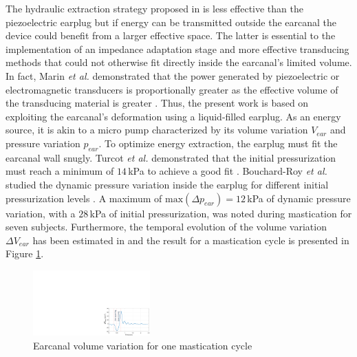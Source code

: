 \documentclass[3p,twocolumn,preprint]{elsarticle}
\begin{document}
The hydraulic extraction strategy proposed in \cite{Delnavaz2012} is less effective than the piezoelectric earplug but if energy can be transmitted outside the earcanal the device could benefit from a larger effective space. The latter is essential to the implementation of an impedance adaptation stage and more effective transducing methods that could not otherwise fit directly inside the earcanal's limited volume. In fact, Marin \emph{et al.} demonstrated that the power generated by piezoelectric or electromagnetic transducers is proportionally greater as the effective volume of the transducing material is greater \cite{Marin2011}. Thus, the present work is based on exploiting the earcanal's deformation using a liquid-filled earplug. As an energy source, it is akin to a micro pump characterized by its volume variation $V_{ear}$ and pressure variation $p_{ear}$. To optimize energy extraction, the earplug must fit the earcanal wall snugly. Turcot \emph{et al.} demonstrated that the initial pressurization must reach a minimum of $14$\,kPa to achieve a good fit \cite{TURCOT2011}. Bouchard-Roy \emph{et al.} studied the dynamic pressure variation inside the earplug for different initial pressurization levels \cite{Bouchard-Roy2020}. A maximum of $\text{max}(\Delta p_{ear})=12$\,kPa of dynamic pressure variation, with a $28$\,kPa of initial pressurization, was noted during mastication for seven subjects. Furthermore, the temporal evolution of the volume variation $\Delta V_{ear}$ has been estimated in \cite{Delnavaz2012} and the result for a mastication cycle is presented in Figure \ref{fig:deltaV_ear}.
\begin{figure}[!htbp]
	\centering
	\captionsetup{justification=centering}
	\includegraphics[trim={20.5cm 0cm 0cm 10.8cm},clip, width=0.4\textwidth]{figures/deltaV_ear.pdf}
	\caption{Earcanal volume variation for one mastication cycle}
	\label{fig:deltaV_ear}
\end{figure}
\end{document}
